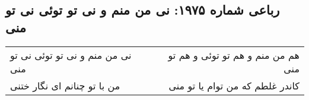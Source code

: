 \begin{center}
\section*{رباعی شماره ۱۹۷۵: نی من منم و نی تو توئی نی تو منی}
\label{sec:1975}
\begin{longtable}{l p{0.5cm} r}
نی من منم و نی تو توئی نی تو منی
&&
هم من منم و هم تو توئی و هم تو منی
\\
من با تو چنانم ای نگار ختنی
&&
کاندر غلطم که من توام یا تو منی
\\
\end{longtable}
\end{center}
